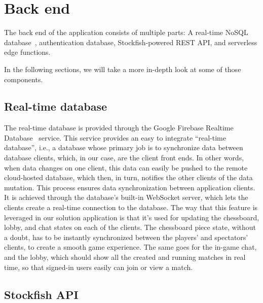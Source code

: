 \section{Back end}\label{sec:backend}

The back end of the application consists of multiple parts: A real-time NoSQL database~\cite{nosql}, authentication
database, Stockfish-powered REST API, and serverless edge functions.

In the following sections, we will take a more in-depth look at some of those components.


\subsection{Real-time database}\label{subsec:real-time-database}

The real-time database is provided through the Google Firebase Realtime Database~\cite{realtime-database} service.
This service provides an easy to integrate ``real-time database'', i.e., a database whose primary job is to synchronize
data between database clients, which, in our case, are the client front ends.
In other words, when data changes on one client, this data can easily be pushed to the remote cloud-hosted database,
which then, in turn, notifies the other clients of the data mutation.
This process ensures data synchronization between application clients.
It is achieved through the database's built-in WebSocket server, which lets the clients create a real-time connection
to the database.
The way that this feature is leveraged in our solution application is that it's used for updating the chessboard, lobby,
and chat states on each of the clients.
The chessboard piece state, without a doubt, has to be instantly synchronized between the players' and spectators'
clients, to create a smooth game experience.
The same goes for the in-game chat, and the lobby, which should show all the created and running matches in real time,
so that signed-in users easily can join or view a match.


\subsection{Stockfish API}\label{subsec:stockfish-api}

